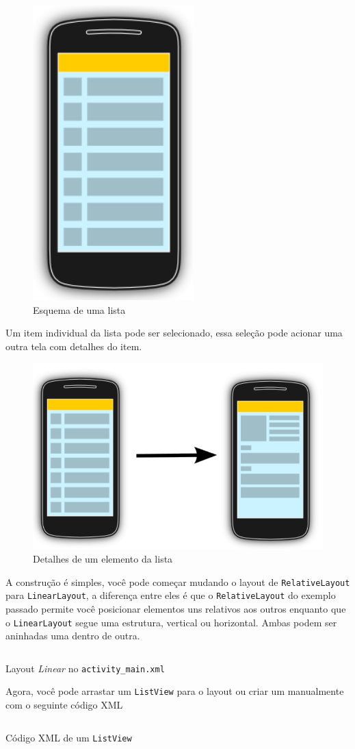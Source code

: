 \documentclass[a4paper,12pt,brazil,doubleside]{book}
\begin{document}
\begin{singlespace}
\begin{figure}[H]
  \centering
  \includegraphics[width=.15\textwidth]{figuras/design/listview-scheme.png}
  \caption{Esquema de uma lista}
  \label{fig:e}
\end{figure}

Um item individual da lista pode ser selecionado, essa seleção pode acionar uma outra tela com detalhes do item.


\begin{figure}[H]
  \centering
  \includegraphics[width=.35\textwidth]{figuras/design/listview-scheme2.png}
  \caption{Detalhes de um elemento da lista}
  \label{fig:e}
\end{figure}

\newpage

A construção é simples, você pode começar mudando o layout de \texttt{RelativeLayout} para \texttt{LinearLayout}, a diferença entre eles é que o \texttt{RelativeLayout} do exemplo passado permite você posicionar elementos uns relativos aos outros enquanto que o \texttt{LinearLayout} segue uma estrutura, vertical ou horizontal. Ambas podem ser aninhadas uma dentro de outra.

\begin{listing}[H]
\inputminted[linenos=true,fontsize=\small,frame=lines, framesep=2mm, tabsize=2,numbersep=5pt]{xml}{../../src/android/design/layout_linear.xml}
\caption{Layout \textit{Linear} no \texttt{activity\_main.xml}}
\end{listing}

Agora, você pode arrastar um \texttt{ListView} para o layout ou criar um manualmente com o seguinte código XML

\begin{listing}[H]
\inputminted[linenos=true,fontsize=\small,frame=lines, framesep=2mm, tabsize=2,numbersep=5pt]{xml}{../../src/android/design/listview.xml}
\caption{Código XML de um \texttt{ListView}}
\end{listing}


\end{singlespace}
\end{document}
